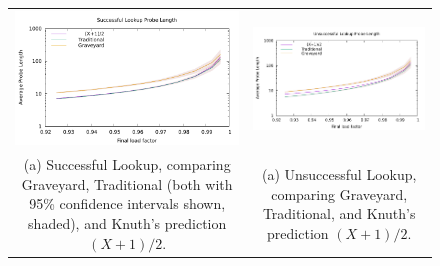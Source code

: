 \documentclass[10pt]{article}
\theoremstyle{remark}
\theoremstyle{remark}
\begin{document}
\begin{figure}
\begin{center}
  \begin{tabular}{cc}
  \includegraphics[width=75mm]{experiments/increasing-load-found}  &
  \includegraphics[width=75mm]{experiments/increasing-load-notfound}  \\
  \begin{minipage}{75mm}
    \footnotesize (a) Successful Lookup, comparing Graveyard,
    Traditional (both with 95\% confidence intervals shown, shaded),
    and Knuth's prediction $(X+1)/2$.
  \end{minipage}
  &
  \begin{minipage}{75mm}
    \footnotesize (a) Unsuccessful Lookup, comparing Graveyard,
    Traditional, and Knuth's prediction $(X+1)/2$.
  \end{minipage}
 

\end{tabular}
\end{center}
\end{figure}
\end{document}
